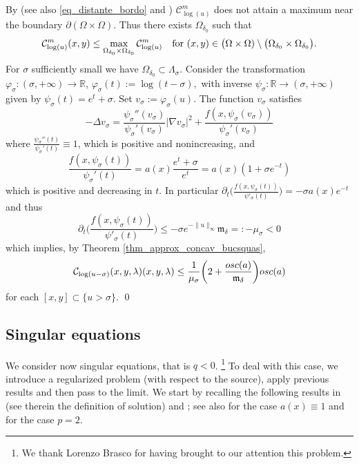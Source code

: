 \documentclass[11pt, reqno]{amsart}
\theoremstyle{definition}
\numberwithin{equation}{section}
\newcommand{\R}{\mathbb{R}}
\newcommand{\mc}[1]{\mathcal{#1}}
\newcommand{\osc}{{\rm osc}}
\def\norm#1{\|#1\|}
\renewenvironment{proof}[1][\proofname]{\medskip \noindent {\bfseries #1. }}{\qed \bigskip}
\begin{document}
\begin{proof}
By \cite[Lemma 3.2]{GrPo93} (see also \eqref{eq_distante_bordo} and \cite{Mor24}) 
$\mc{C}^m_{\log(u)}$ does not attain a maximum near the boundary $\partial (\Omega \times \Omega)$. Thus there exists $\Omega_{\delta_0}$ such that
$$\mc{C}_{\log(u)}^m(x,y) \leq \max_{\Omega_{\delta_0} \times \Omega_{\delta_0}} \mc{C}_{\log(u)}^m \quad \hbox{for $(x, y) \in \big(\Omega \times \Omega) \setminus\big(\Omega_{\delta_0}\times \Omega_{\delta_0}\big)$.}$$
For $\sigma$ sufficiently small we have $\Omega_{\delta_0} \subset \Lambda_{\sigma}$.
Consider the transformation $\varphi_{\sigma}: (\sigma, +\infty) \to \R$, 
$\varphi_{\sigma}(t):=\log(t-\sigma),$ 
with inverse $\psi_{\sigma}: \R\to (\sigma, +\infty)$ given by $\psi_{\sigma}(t)=e^t+\sigma$. 
Set $v_{\sigma}:= \varphi_{\sigma}(u)$.
The function $v_{\sigma}$ satisfies
$$-\Delta v_{\sigma} = \frac{\psi_{\sigma}''(v_{\sigma})}{\psi_{\sigma}'(v_{\sigma})} |\nabla v_{\sigma}|^2 + \frac{f(x,\psi_{\sigma}(v_{\sigma}))}{\psi_{\sigma}'(v_{\sigma})}$$
where $\frac{\psi_{\sigma}''(t)}{\psi_{\sigma}'(t)} \equiv 1$, which is positive and nonincreasing, and
$$ \frac{f(x,\psi_{\sigma}(t))}{\psi_{\sigma}'(t)} = a(x) \frac{e^{t} +\sigma}{e^{t}} = a(x) \left(1 +\sigma e^{-t}\right)$$
which is positive and decreasing in $t$. 
In particular $\partial_t \Big(\frac{f(x,\psi_{\sigma}(t))}{\psi'_{\sigma}(t)}\Big) = - \sigma a(x) e^{-t}$ and thus
$$\partial_t \bigg(\frac{f(x,\psi_{\sigma}(t))}{\psi'_{\sigma}(t)}\bigg) \leq - \sigma e^{-\norm{u}_{\infty}} \mathfrak{m}_{\delta} =: - \mu_{\sigma} < 0$$
which implies, by Theorem \ref{thm_approx_concav_bucsquas}, 
$$\mc{C}_{\log(u-\sigma)}(x,y,\lambda)(x,y,\lambda) \leq \frac{1}{\mu_{\sigma}} \bigg( 2 + \frac{\osc(a)}{\mathfrak{m}_{\delta}}\bigg) \osc(a)$$
for each $[x,y] \subset \{u > \sigma\}.$
\end{proof}


\subsection{Singular equations}
\label{sec_singular}

We consider now singular equations, that is $q<0$.%
\footnote{We thank Lorenzo Brasco for having brought to our attention this problem.}
To deal with this case, we introduce a regularized problem (with respect to the source), apply previous results and then pass to the limit.
We start by recalling the following results in \cite[Theorems 1.3 and 1.5]{CST16} (see therein the definition of solution) and \cite[Corollary 2.4]{CaDe04}; see also \cite[Teorema 2.3]{Gla02} for the case $a(x) \equiv 1$ and \cite{BoOr10} for the case $p=2$.
\end{document}
